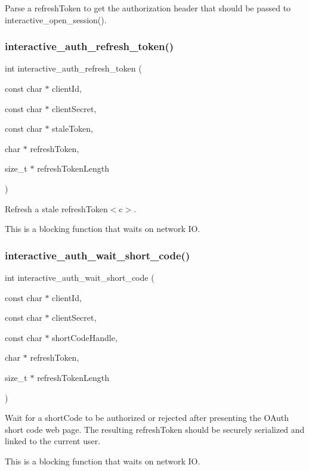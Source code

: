 Parse a {\ttfamily refresh\+Token} to get the authorization header that should be passed to {\ttfamily interactive\+\_\+open\+\_\+session()}. 

\mbox{\label{group__interactivity_ga13cfa6f76168be83cf29602bdcf1d0fc}} 
\subsubsection{\texorpdfstring{interactive\+\_\+auth\+\_\+refresh\+\_\+token()}{interactive\_auth\_refresh\_token()}}
{\footnotesize\ttfamily int interactive\+\_\+auth\+\_\+refresh\+\_\+token (\begin{DoxyParamCaption}\item[{const char $\ast$}]{client\+Id,  }\item[{const char $\ast$}]{client\+Secret,  }\item[{const char $\ast$}]{stale\+Token,  }\item[{char $\ast$}]{refresh\+Token,  }\item[{size\+\_\+t $\ast$}]{refresh\+Token\+Length }\end{DoxyParamCaption})}



Refresh a stale {\ttfamily refresh\+Token$<$c$>$. }

{\ttfamily  }

This is a blocking function that waits on network IO. \mbox{\label{group__interactivity_ga16c877f68b6ff400719fc50e3c824a83}} 
\subsubsection{\texorpdfstring{interactive\+\_\+auth\+\_\+wait\+\_\+short\+\_\+code()}{interactive\_auth\_wait\_short\_code()}}
{\footnotesize\ttfamily int interactive\+\_\+auth\+\_\+wait\+\_\+short\+\_\+code (\begin{DoxyParamCaption}\item[{const char $\ast$}]{client\+Id,  }\item[{const char $\ast$}]{client\+Secret,  }\item[{const char $\ast$}]{short\+Code\+Handle,  }\item[{char $\ast$}]{refresh\+Token,  }\item[{size\+\_\+t $\ast$}]{refresh\+Token\+Length }\end{DoxyParamCaption})}



Wait for a {\ttfamily short\+Code} to be authorized or rejected after presenting the O\+Auth short code web page. The resulting {\ttfamily refresh\+Token} should be securely serialized and linked to the current user. 

This is a blocking function that waits on network IO. 